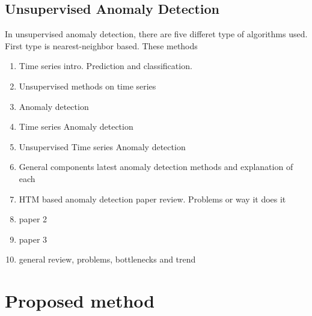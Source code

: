 \documentclass[12pt]{article}
\begin{document}
\subsection{Unsupervised Anomaly Detection}
In unsupervised anomaly detection, there are five differet type of algorithms used. First type is nearest-neighbor based. These methods 
\begin{enumerate}
	\item Time series intro. Prediction and classification.
	\item Unsupervised methods on time series 
	\item Anomaly detection
	\item Time series Anomaly detection
	\item Unsupervised Time series Anomaly detection
	\item General components latest anomaly detection methods and explanation of each
	\item HTM based anomaly detection paper review. Problems or way it does it
	\item paper 2
	\item paper 3
	\item general review, problems, bottlenecks and trend
\end{enumerate}
\newpage
\section{Proposed method}
\end{document}
